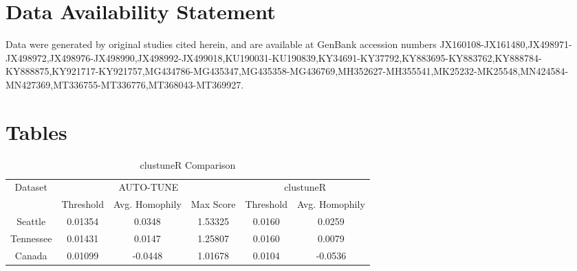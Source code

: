 \documentclass[utf8]{FrontiersinHarvard} %
\begin{document}
\section*{Data Availability Statement}

Data were generated by original studies cited herein, and are available at GenBank accession numbers
JX160108-JX161480,JX498971-JX498972,JX498976-JX498990,JX498992-JX499018,KU190031-KU190839,KY34691-KY37792,KY883695-KY883762,KY888784-KY888875,KY921717-KY921757,MG434786-MG435347,MG435358-MG436769,MH352627-MH355541,MK25232-MK25548,MN424584-MN427369,MT336755-MT336776,MT368043-MT369927.


\nocite{*}


\section*{Tables}

\begin{table}[h]
	\caption{clustuneR Comparison}
	\vspace{8pt}
	\centering
	\label{tab:homophily}
	\begin{tabular}{|c|c|c|c|c|c|}
		\hline
		Dataset   & \multicolumn{3}{c|}{AUTO-TUNE} & \multicolumn{2}{c|}{clustuneR}                                          \\
		\cline{2-6}
		          & Threshold                      & Avg. Homophily                 & Max Score & Threshold & Avg. Homophily \\
		\hline
		Seattle   & 0.01354                        & 0.0348                         & 1.53325   & 0.0160    & 0.0259         \\
		Tennessee & 0.01431                        & 0.0147                         & 1.25807   & 0.0160    & 0.0079         \\
		Canada    & 0.01099                        & -0.0448                        & 1.01678   & 0.0104    & -0.0536        \\
		\hline
	\end{tabular}
\end{table}
\end{document}
